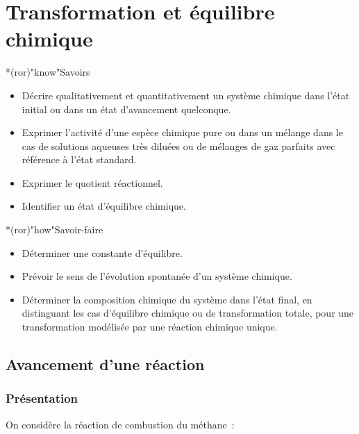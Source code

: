 \documentclass[../../main/main.tex]{subfiles}
\begin{document}
\setcounter{chapter}{1}

\chapter{Transformation et \'equilibre chimique}

\vfill

\begin{prgm}
	\begin{tcb}*(ror)"know"{Savoirs}
		\begin{itemize}[label=$\diamond$, leftmargin=10pt]
			\item Décrire qualitativement et quantitativement un
			      système chimique dans l'état initial ou dans un état d'avancement
			      quelconque.
			\item Exprimer l'activité d'une espèce chimique pure ou
			      dans un mélange dans le cas de solutions aqueuses très diluées ou de
			      mélanges de gaz parfaits avec référence à l'état standard.
			\item Exprimer le quotient réactionnel.
			\item Identifier un état d'équilibre chimique.
		\end{itemize}
	\end{tcb}

	\begin{tcb}*(ror)"how"{Savoir-faire}
		\begin{itemize}[label=$\diamond$, leftmargin=10pt]
			\item Déterminer une constante d'équilibre.
			\item Prévoir le sens de l'évolution spontanée d'un système chimique.
			\item Déterminer la composition chimique du système dans l'état final, en
			      distinguant les cas d'équilibre chimique ou de transformation totale,
			      pour une transformation modélisée par une réaction chimique unique.
		\end{itemize}
	\end{tcb}
\end{prgm}

\vfill
\minitoc
\vfill

\newpage

\section{Avancement d'une réaction}
\subsection{Présentation}
On considère la réaction de combustion du méthane~:
\psw{
	\[
		\ce{CH4\gaz{} + 2 O2\gaz{} = CO2\gaz{} + 2H2O\gaz}
	\]
}\vspace{-15pt}
\end{document}
